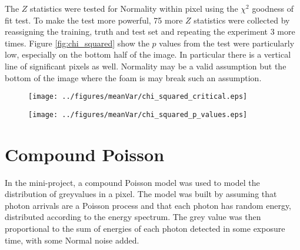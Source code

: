 \documentclass[a4paper]{proc}
\begin{document}
The $Z$ statistics were tested for Normality within pixel using the $\chi^2$ goodness of fit test. To make the test more powerful, 75 more $Z$ statistics were collected by reassigning the training, truth and test set and repeating the experiment 3 more times. Figure \ref{fig:chi_squared} show the $p$ values from the test were particularly low, especially on the bottom half of the image. In particular there is a vertical line of significant pixels as well. Normality may be a valid assumption but the bottom of the image where the foam is may break such an assumption.

\begin{figure*}
	\centering
	\begin{subfigure}{0.45\textwidth}
		\texttt{[image: ../figures/meanVar/chi\_squared\_critical.eps]}
	\end{subfigure}
	\begin{subfigure}{0.45\textwidth}
		\texttt{[image: ../figures/meanVar/chi\_squared\_p\_values.eps]}
	\end{subfigure}
	\caption{$p$ values from the $\chi^2$ goodness of fit test within pixel. Highlighted in red are significant pixels at the $2\sigma$ significant level corrected for multiply testing using the Bonferroni correction.}
	\label{fig:chi_squared}
\end{figure*}

\section{Compound Poisson}
In the mini-project, a compound Poisson model was used to model the distribution of greyvalues in a pixel. The model was built by assuming that photon arrivals are a Poisson process and that each photon has random energy, distributed according to the energy spectrum. The grey value was then proportional to the sum of energies of each photon detected in some exposure time, with some Normal noise added.
\end{document}
